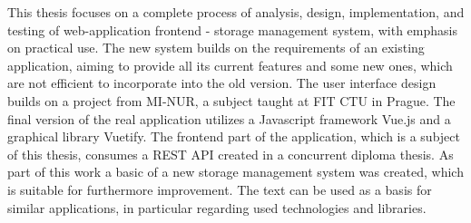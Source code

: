 This thesis focuses on a complete process of analysis, design, implementation, and testing of web-application frontend - storage management system, with emphasis on practical use. The new system builds on the requirements of an existing application, aiming to provide all its current features and some new ones, which are not efficient to incorporate into the old version. The user interface design builds on a project from MI-NUR, a subject taught at FIT CTU in Prague. The final version of the real application utilizes a Javascript framework Vue.js and a graphical library Vuetify. The frontend part of the application, which is a subject of this thesis, consumes a REST API created in a concurrent diploma thesis. As part of this work a basic of a new storage management system was created, which is suitable for furthermore improvement. The text can be used as a basis for similar applications, in particular regarding used technologies and libraries.
